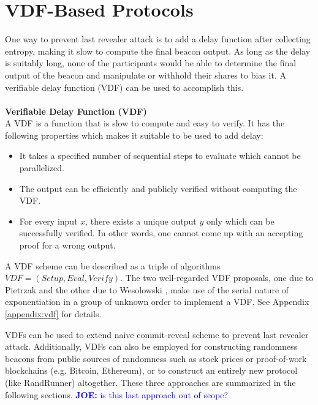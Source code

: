 \documentclass[letterpaper,twocolumn,10pt]{article}
\theoremstyle{definition}
\theoremstyle{remark}
\newcommand{\joenote}[1]{\textcolor{blue}{\textbf{JOE:} #1}}
\begin{document}
\section{VDF-Based Protocols}
\label{section:vdf}
One way to prevent last revealer attack is to add a delay function after collecting entropy, making it slow to compute the final beacon output. As long as the delay is suitably long, none of the participants would be able to determine the final output of the beacon and manipulate or withhold their shares to bias it. A verifiable delay function (VDF) \cite{boneh2018verifiable} can be used to accomplish this. \\\\
\textbf{Verifiable Delay Function (VDF)}\\
A VDF is a function that is slow to compute and easy to verify. It has the following properties which makes it suitable to be used to add delay:
\begin{itemize}
    \item It takes a specified number of sequential steps to evaluate which cannot be parallelized.
    \item The output can be efficiently and publicly verified without computing the VDF.
    \item For every input $x$, there exists a unique output $y$ only which can be successfully verified. In other words, one cannot come up with an accepting proof for a wrong output.
\end{itemize}
A VDF scheme can be described as a triple of algorithms $ VDF = (Setup, Eval, Verify)$. The two well-regarded VDF proposals, one due to Pietrzak \cite{pietrzak2018simple} and the other due to Wesolowski \cite{wesolowski2019efficient}, make use of the serial nature of exponentiation in a group of unknown order to implement a VDF. See Appendix \ref{appendix:vdf} for details.

VDFs can be used to extend naive commit-reveal scheme to prevent last revealer attack. Additionally, VDFs can also be employed for constructing randomness beacons from public sources of randomness such as stock prices or proof-of-work blockchains (e.g. Bitcoin, Ethereum), or to construct an entirely new protocol (like RandRunner) altogether. These three approaches are summarized in the following sections.
\joenote{is this last approach out of scope?}
\end{document}
